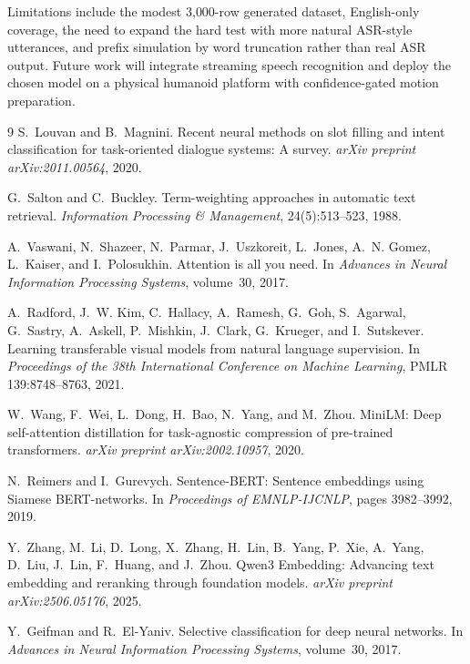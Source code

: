\documentclass{article}
\begin{document}
Limitations include the modest 3{,}000-row generated dataset, English-only
coverage, the need to expand the hard test with more natural ASR-style
utterances, and prefix simulation by word truncation rather than real ASR
output.
Future work will integrate streaming speech recognition and deploy the chosen
model on a physical humanoid platform with confidence-gated motion preparation.

\begin{thebibliography}{9}
S.~Louvan and B.~Magnini.
\newblock Recent neural methods on slot filling and intent classification for
task-oriented dialogue systems: A survey.
\newblock \emph{arXiv preprint arXiv:2011.00564}, 2020.

G.~Salton and C.~Buckley.
\newblock Term-weighting approaches in automatic text retrieval.
\newblock \emph{Information Processing \& Management}, 24(5):513--523, 1988.

A.~Vaswani, N.~Shazeer, N.~Parmar, J.~Uszkoreit, L.~Jones, A.~N. Gomez,
L.~Kaiser, and I.~Polosukhin.
\newblock Attention is all you need.
\newblock In \emph{Advances in Neural Information Processing Systems},
volume~30, 2017.

A.~Radford, J.~W. Kim, C.~Hallacy, A.~Ramesh, G.~Goh, S.~Agarwal,
G.~Sastry, A.~Askell, P.~Mishkin, J.~Clark, G.~Krueger, and I.~Sutskever.
\newblock Learning transferable visual models from natural language
supervision.
\newblock In \emph{Proceedings of the 38th International Conference on
Machine Learning}, PMLR 139:8748--8763, 2021.

W.~Wang, F.~Wei, L.~Dong, H.~Bao, N.~Yang, and M.~Zhou.
\newblock MiniLM: Deep self-attention distillation for task-agnostic
compression of pre-trained transformers.
\newblock \emph{arXiv preprint arXiv:2002.10957}, 2020.

N.~Reimers and I.~Gurevych.
\newblock Sentence-BERT: Sentence embeddings using Siamese BERT-networks.
\newblock In \emph{Proceedings of EMNLP-IJCNLP}, pages 3982--3992, 2019.

Y.~Zhang, M.~Li, D.~Long, X.~Zhang, H.~Lin, B.~Yang, P.~Xie, A.~Yang,
D.~Liu, J.~Lin, F.~Huang, and J.~Zhou.
\newblock Qwen3 Embedding: Advancing text embedding and reranking through
foundation models.
\newblock \emph{arXiv preprint arXiv:2506.05176}, 2025.

Y.~Geifman and R.~El-Yaniv.
\newblock Selective classification for deep neural networks.
\newblock In \emph{Advances in Neural Information Processing Systems},
volume~30, 2017.
\end{thebibliography}
\end{document}
